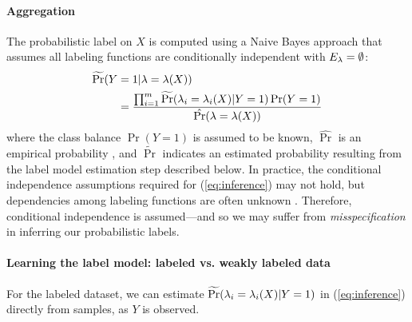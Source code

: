 \paragraph{Aggregation} The probabilistic label on $X$ is computed using a Naive Bayes approach that assumes all labeling functions are conditionally independent with $E_{\lambda} = \emptyset$:
\begin{align}
    \widetilde{\Pr}(Y &= 1 | \lambda = \lambda(X)) \\
    &= \frac{\prod_{i = 1}^m \widetilde{\Pr}(\lambda_i = \lambda_i(X) | Y = 1) \Pr(Y = 1)}{\hat{\Pr}(\lambda = \lambda(X))} 
    \label{eq:inference}
\end{align}
where the class balance $\Pr(Y = 1)$ is assumed to be known, $\hat{\Pr}$ is an empirical probability
, and $\widetilde{\Pr}$ indicates an estimated probability resulting from the label model estimation step described below. %
%
In practice, the conditional independence assumptions required for (\ref{eq:inference}) may not hold, but dependencies among labeling functions are often unknown%
. Therefore, conditional independence is assumed---and so we may suffer from \emph{misspecification} in inferring our probabilistic labels. %


\paragraph{Learning the label model: labeled vs. weakly labeled data}
For the labeled dataset, we can estimate $\widetilde{\Pr}(\lambda_i = \lambda_i(X) | Y = 1)$ in (\ref{eq:inference}) directly from samples, as $Y$ is observed. 

